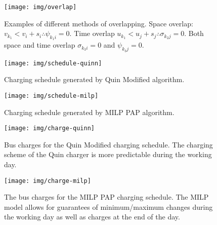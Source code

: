 \documentclass[utf8]{FrontiersinHarvard}
\begin{document}
\begin{figure}[htpb]
\centering
    \texttt{[image: img/overlap]}
    \caption{Examples of different methods of overlapping. Space overlap: $v_{k_1} < v_{i} + s_i \therefore \psi_{k_{1}i} = 0$.
             Time overlap $u_{k_1} < u_{j} + s_j \therefore \sigma_{k_{2}j} = 0$. Both space and time overlap $\sigma_{k_{3}i} = 0$ and
             $\psi_{k_{3}j} = 0$.}
    \label{fig:multipleassign}
\end{figure}

\begin{subfigures}
    \begin{figure}[htpb]
    \centering
        \texttt{[image: img/schedule-quinn]}
        \caption{Charging schedule generated by Quin Modified algorithm.}
        \label{subfig:quin-schedule}
    \end{figure}

    \hfill

    \begin{figure}[htpb]
    \centering
        \texttt{[image: img/schedule-milp]}
        \caption{Charging schedule generated by MILP PAP algorithm.}
        \label{subfig:milp-schedule}
    \end{figure}
\end{subfigures}

\begin{subfigures}
    \begin{figure}[htpb]
    \centering
        \texttt{[image: img/charge-quinn]}
        \caption{Bus charges for the Quin Modified charging schedule. The charging scheme of the Quin charger is more predictable during the working day.}
        \label{subfig:quin-charge}
    \end{figure}

    \hfill

    \begin{figure}[htpb]
    \centering
        \texttt{[image: img/charge-milp]}
        \caption{The bus charges for the MILP PAP charging schedule. The MILP model allows for guarantees of minimum/maximum changes during the working day as well as charges at the end of the day.}
        \label{subfig:milp-charge}
    \end{figure}
\end{subfigures}
\end{document}
